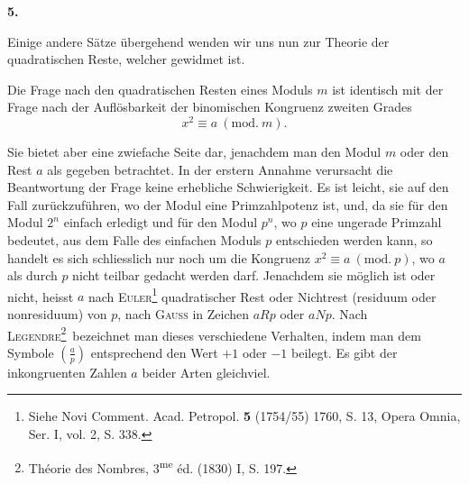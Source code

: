 \par\bigskip{}
\begin{center}\bfseries 5.\end{center}
\noindent\hspace*{\parindent}Einige andere Sätze übergehend wenden wir uns nun zur Theorie der quadratischen Reste, welcher  gewidmet ist.

Die Frage nach den quadratischen Resten eines Moduls \(m\) ist identisch mit der Frage nach der Auflösbarkeit der binomischen Kongruenz zweiten Grades
\[
x^2\equiv a\ (\mathrm{mod.}\ m).
\]

Sie bietet aber eine zwiefache Seite dar, jenachdem man den Modul \(m\) oder den Rest \(a\) als gegeben betrachtet. In der erstern Annahme verursacht die Beantwortung der Frage keine erhebliche Schwierigkeit. Es ist leicht, sie auf den Fall zurückzuführen, wo der Modul eine Primzahlpotenz ist, und, da sie für den Modul \(2^n\) einfach erledigt und für den Modul \(p^n\), wo \(p\) eine ungerade Primzahl bedeutet, aus dem Falle des einfachen Moduls \(p\) entschieden werden kann, so handelt es sich schliesslich nur noch um die Kongruenz\newpage
{}
\noindent \(x^2\equiv a\ (\mathrm{mod.}\ p)\), wo \(a\) als durch \(p\) nicht teilbar gedacht werden darf. Jenachdem sie möglich ist oder nicht, heisst \(a\) nach \textsc{Euler}\footnote{Siehe Novi Comment. Acad. Petropol. \textbf{5} (1754/55) 1760, S. 13, Opera Omnia, Ser. I, vol. 2, S. 338.} quadratischer Rest oder Nichtrest (residuum oder nonresiduum) von \(p\), nach \textsc{Gauss} in Zeichen \(aRp\) oder \(aNp\). Nach \textsc{Legendre}\begingroup\renewcommand{\thefootnote}{**)}\footnote{Théorie des Nombres, 3\textsuperscript{me} éd. (1830) I, S. 197.}\endgroup\ bezeichnet man dieses verschiedene Verhalten, indem man dem Symbole \(\left(\frac{a}{p}\right)\) entsprechend den Wert \(+1\) oder \(-1\) beilegt. Es gibt der inkongruenten Zahlen \(a\) beider Arten gleichviel.

